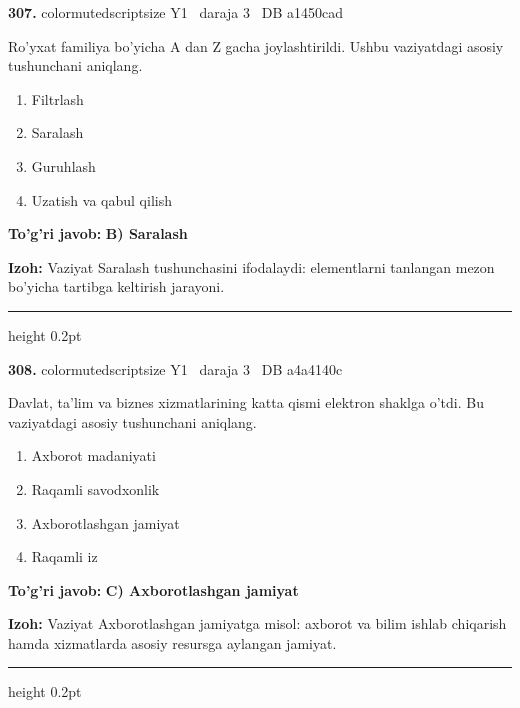 \documentclass[10pt,a4paper,oneside]{article}
\begin{document}
\noindent\textbf{\color{ink}307.}  {color{muted}scriptsize Y1 \textbullet\ daraja 3 \textbullet\ DB a1450cad}
\par
Ro'yxat familiya bo'yicha A dan Z gacha joylashtirildi. Ushbu vaziyatdagi asosiy tushunchani aniqlang.
\begin{enumerate}[label=\Alph*),leftmargin=9mm]
\item Filtrlash
\item Saralash
\item Guruhlash
\item Uzatish va qabul qilish
\end{enumerate}
\begin{tcolorbox}[enhanced,breakable,colback=teal!4,colframe=teal!50!black,boxrule=0.5pt,arc=1.1mm,left=3mm,right=3mm,top=1.7mm,bottom=1.7mm,before skip=2mm,after skip=2mm]
\textbf{\color{teal}To'g'ri javob:} \textbf{B) Saralash}
\par\smallskip
\textbf{Izoh:} Vaziyat Saralash tushunchasini ifodalaydi: elementlarni tanlangan mezon bo'yicha tartibga keltirish jarayoni.
\end{tcolorbox}
\vspace{2mm}\hrule height 0.2pt \vspace{3mm}

\noindent\textbf{\color{ink}308.}  {color{muted}scriptsize Y1 \textbullet\ daraja 3 \textbullet\ DB a4a4140c}
\par
Davlat, ta'lim va biznes xizmatlarining katta qismi elektron shaklga o'tdi. Bu vaziyatdagi asosiy tushunchani aniqlang.
\begin{enumerate}[label=\Alph*),leftmargin=9mm]
\item Axborot madaniyati
\item Raqamli savodxonlik
\item Axborotlashgan jamiyat
\item Raqamli iz
\end{enumerate}
\begin{tcolorbox}[enhanced,breakable,colback=teal!4,colframe=teal!50!black,boxrule=0.5pt,arc=1.1mm,left=3mm,right=3mm,top=1.7mm,bottom=1.7mm,before skip=2mm,after skip=2mm]
\textbf{\color{teal}To'g'ri javob:} \textbf{C) Axborotlashgan jamiyat}
\par\smallskip
\textbf{Izoh:} Vaziyat Axborotlashgan jamiyatga misol: axborot va bilim ishlab chiqarish hamda xizmatlarda asosiy resursga aylangan jamiyat.
\end{tcolorbox}
\vspace{2mm}\hrule height 0.2pt \vspace{3mm}
\end{document}
